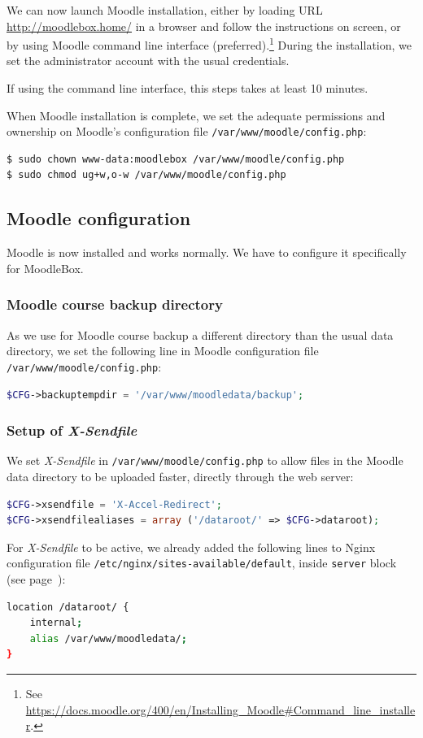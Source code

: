 \documentclass[12pt]{article}
\begin{document}
We can now launch Moodle installation, either by loading URL \url{http://moodlebox.home/} in a browser and follow the instructions on screen, or by using Moodle command line interface (preferred).\footnote{See \url{https://docs.moodle.org/400/en/Installing_Moodle\#Command_line_installer}.}
During the installation, we set the administrator account with the usual credentials.

If using the command line interface, this steps takes at least 10 minutes.

When Moodle installation is complete, we set the adequate permissions and ownership on Moodle's configuration file \lstinline{/var/www/moodle/config.php}:
\begin{lstlisting}[language=bash]
$ sudo chown www-data:moodlebox /var/www/moodle/config.php
$ sudo chmod ug+w,o-w /var/www/moodle/config.php
\end{lstlisting}

\subsection{Moodle configuration}

Moodle is now installed and works normally.
We have to configure it specifically for MoodleBox.

\subsubsection{Moodle course backup directory}

As we use for Moodle course backup a different directory than the usual data directory, we set the following line in Moodle configuration file \lstinline{/var/www/moodle/config.php}:
\begin{lstlisting}[language=php]
$CFG->backuptempdir = '/var/www/moodledata/backup';
\end{lstlisting}

\subsubsection{Setup of \emph{X-Sendfile}}

We set \emph{X-Sendfile} in \lstinline{/var/www/moodle/config.php} to allow files in the Moodle data directory to be uploaded faster, directly through the web server:
\begin{lstlisting}[language=php]
$CFG->xsendfile = 'X-Accel-Redirect';
$CFG->xsendfilealiases = array ('/dataroot/' => $CFG->dataroot);
\end{lstlisting}
For \emph{X-Sendfile} to be active, we already added the following lines to Nginx configuration file \lstinline{/etc/nginx/sites-available/default}, inside \lstinline{server} block (see page~\pageref{ssec-nginx-php}):
\begin{lstlisting}[language=bash]
location /dataroot/ {
    internal;
    alias /var/www/moodledata/;
}
\end{lstlisting}
\end{document}
